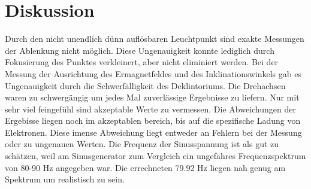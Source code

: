 \section{Diskussion}
\label{sec:Diskussion}

Durch den nicht unendlich dünn auflösbaren Leuchtpunkt sind exakte Messungen der Ablenkung nicht möglich.
Diese Ungenauigkeit konnte lediglich durch Fokusierung des Punktes verkleinert, aber nicht eliminiert werden.
Bei der Messung der Ausrichtung des Ermagnetfeldes und des Inklinationswinkels gab es Ungenauigkeit durch die Schwerfälligkeit des Deklintoriums.
Die Drehachsen waren zu schwergängig um jedes Mal zuverlässige Ergebnisse zu liefern.
Nur mit sehr viel feingefühl sind akzeptable Werte zu vermessen.
Die Abweichungen der Ergebisse liegen noch im akzeptablen bereich, bis auf die spezifische Ladung von Elektronen.
Diese imense Abweichung liegt entweder an Fehlern bei der Messung oder zu ungenauen Werten.
Die Frequenz der Sinusspannung ist als gut zu schätzen, weil am Sinusgenerator zum Vergleich ein ungefähres Frequenzspektrum von 80-90 Hz angegeben war.
Die errechneten 79.92 Hz liegen nah genug am Spektrum um realistisch zu sein.